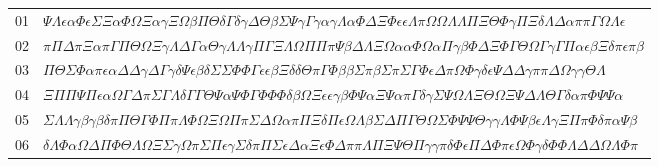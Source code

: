 \documentclass[11pt,a4paper]{article}
\begin{document}
\begin{boitecertificat}
\color{white}
\centering
{\fontsize{4.4}{5.2}\selectfont
\begin{tabular}{@{}r l@{}}
01 & \textcolor{spectralargent}{$\Psi\Lambda\epsilon\alpha\Phi\epsilon\Sigma\Xi\alpha\Phi\Omega\Xi\alpha\gamma\Xi\Omega\beta\Pi\Theta\delta\Gamma\delta\gamma\Delta\Theta\beta\Sigma\Psi\gamma\Gamma\gamma\alpha\gamma\Lambda\alpha\Phi\Delta\Xi\Phi\epsilon\epsilon\Lambda\pi\Omega\Omega\Lambda\Lambda\Pi\Xi\Theta\Phi\gamma\Pi\Xi\delta\Lambda\Delta\alpha\pi\pi\Gamma\Omega\Lambda\epsilon$} \\
02 & \textcolor{spectralargent}{$\pi\Pi\Delta\pi\Xi\alpha\pi\Gamma\Pi\Theta\Omega\Xi\gamma\Lambda\Delta\Gamma\alpha\Theta\gamma\Lambda\Lambda\gamma\Pi\Gamma\Xi\Lambda\Omega\Pi\Pi\pi\Psi\beta\Delta\Lambda\Xi\Omega\alpha\alpha\Phi\Omega\alpha\Pi\gamma\beta\Phi\Delta\Xi\Phi\Gamma\Theta\Omega\Gamma\gamma\Gamma\Pi\alpha\epsilon\beta\Xi\delta\pi\epsilon\pi\beta$} \\
03 & \textcolor{spectralargent}{$\Pi\Theta\Sigma\Phi\alpha\pi\epsilon\alpha\Delta\Delta\gamma\Delta\Gamma\gamma\delta\Psi\epsilon\beta\delta\Sigma\Sigma\Phi\Phi\Gamma\epsilon\epsilon\beta\Xi\delta\delta\Theta\pi\Gamma\Phi\beta\beta\Sigma\pi\beta\Sigma\pi\Sigma\Gamma\Phi\epsilon\Delta\pi\Omega\Phi\gamma\delta\epsilon\Psi\Delta\Delta\gamma\pi\pi\Delta\Omega\gamma\gamma\Theta\Lambda$} \\
04 & \textcolor{spectralargent}{$\Xi\Pi\Pi\Psi\Pi\epsilon\alpha\Omega\Gamma\Delta\pi\Sigma\Gamma\Lambda\delta\Gamma\Gamma\Theta\Psi\alpha\Psi\Phi\Gamma\Phi\Phi\Phi\delta\beta\Omega\Xi\epsilon\epsilon\gamma\beta\Phi\Psi\alpha\Xi\Psi\alpha\pi\Gamma\delta\gamma\Sigma\Psi\Omega\Lambda\Xi\Theta\Omega\Xi\Psi\Delta\Lambda\Theta\Gamma\delta\alpha\pi\Phi\Psi\Psi\alpha$} \\
05 & \textcolor{spectralargent}{$\Sigma\Lambda\Lambda\gamma\beta\gamma\beta\delta\pi\Pi\Theta\Gamma\Phi\Pi\pi\Lambda\Phi\Omega\Xi\Omega\Pi\pi\Sigma\Delta\Omega\alpha\pi\Pi\Xi\delta\Pi\epsilon\Omega\Lambda\beta\Sigma\Delta\Pi\Gamma\Theta\Omega\Sigma\Phi\Psi\Psi\Theta\gamma\gamma\Lambda\Phi\Psi\beta\epsilon\Lambda\gamma\Xi\Pi\pi\Phi\delta\pi\alpha\Psi\beta$} \\
06 & \textcolor{spectralargent}{$\delta\Lambda\Phi\alpha\Omega\Delta\Pi\Phi\Theta\Lambda\Omega\Xi\Sigma\gamma\Omega\pi\Sigma\Pi\epsilon\gamma\Sigma\delta\pi\Pi\Sigma\epsilon\Delta\alpha\Xi\epsilon\Phi\Delta\pi\pi\Lambda\Pi\Xi\Psi\Theta\Pi\gamma\gamma\pi\delta\Phi\epsilon\Pi\Delta\Phi\pi\epsilon\Omega\Phi\gamma\delta\Phi\Phi\Lambda\Delta\Delta\Omega\Lambda\Phi\pi$} \\

\end{tabular}}
\end{boitecertificat}
\end{document}
